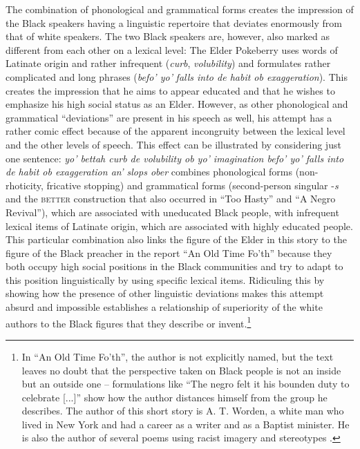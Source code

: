 The combination of phonological and grammatical forms creates the impression of the Black speakers having a linguistic repertoire that deviates enormously from that of white speakers. The two Black speakers are, however, also marked as different from each other on a lexical level: The Elder Pokeberry uses words of Latinate origin and rather infrequent (\emph{curb}, \emph{volubility}) and formulates rather complicated and long phrases (\emph{befo’ yo’} \emph{falls into de habit ob exaggeration}). This creates the impression that he aims to appear educated and that he wishes to emphasize his high social status as an Elder. However, as other phonological and grammatical “deviations” are present in his speech as well, his attempt has a rather comic effect because of the apparent incongruity between the lexical level and the other levels of speech. This effect can be illustrated by considering just one sentence: \emph{yo’ bettah curb de volubility ob yo’ imagination befo’ yo’ falls into de habit ob exaggeration an’ slops ober} combines phonological forms (non-rhoticity, fricative stopping) and grammatical forms (second-person singular -\emph{s} and the \textsc{better} construction that also occurred in “Too Hasty” and “A Negro Revival”), which are associated with uneducated Black people, with infrequent lexical items of Latinate origin, which are associated with highly educated people. This particular combination also links the figure of the Elder in this story to the figure of the Black preacher in the report “An Old Time Fo’th” because they both occupy high social positions in the Black communities and try to adapt to this position linguistically by using specific lexical items. Ridiculing this by showing how the presence of other linguistic deviations makes this attempt absurd and impossible establishes a relationship of superiority of the white authors to the Black figures that they describe or invent.\footnote{In “An Old Time Fo’th”, the author is not explicitly named, but the text leaves no doubt that the perspective taken on Black people is not an inside but an outside one – formulations like “The negro felt it his bounden duty to celebrate [...]” show how the author distances himself from the group he describes. The author of this short story is A. T. Worden, a white man who lived in New York and had a career as a writer and as a Baptist minister. He is also the author of several poems using racist imagery and stereotypes \citep[62--63]{Young2008}.}

